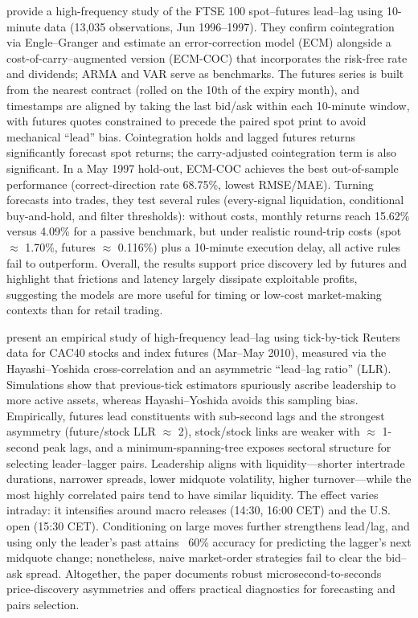\cite{BROOKS200131} provide a high-frequency study of the FTSE 100 spot--futures lead--lag using 10-minute data (13{,}035 observations, Jun 1996--1997). They confirm cointegration via Engle--Granger and estimate an error-correction model (ECM) alongside a cost-of-carry–augmented version (ECM-COC) that incorporates the risk-free rate and dividends; ARMA and VAR serve as benchmarks. The futures series is built from the nearest contract (rolled on the 10th of the expiry month), and timestamps are aligned by taking the last bid/ask within each 10-minute window, with futures quotes constrained to precede the paired spot print to avoid mechanical “lead” bias. Cointegration holds and lagged futures returns significantly forecast spot returns; the carry-adjusted cointegration term is also significant. In a May 1997 hold-out, ECM-COC achieves the best out-of-sample performance (correct-direction rate 68.75\%, lowest RMSE/MAE). Turning forecasts into trades, they test several rules (every-signal liquidation, conditional buy-and-hold, and filter thresholds): without costs, monthly returns reach 15.62\% versus 4.09\% for a passive benchmark, but under realistic round-trip costs (spot $\approx$ 1.70\%, futures $\approx$ 0.116\%) plus a 10-minute execution delay, all active rules fail to outperform. Overall, the results support price discovery led by futures and highlight that frictions and latency largely dissipate exploitable profits, suggesting the models are more useful for timing or low-cost market-making contexts than for retail trading.

\cite{huth2012leadlag} present an empirical study of high-frequency lead–lag using tick-by-tick Reuters data for CAC40 stocks and index futures (Mar–May 2010), measured via the Hayashi–Yoshida cross-correlation and an asymmetric “lead–lag ratio” (LLR). Simulations show that previous-tick estimators spuriously ascribe leadership to more active assets, whereas Hayashi–Yoshida avoids this sampling bias. Empirically, futures lead constituents with sub-second lags and the strongest asymmetry (future/stock LLR $\approx$ 2), stock/stock links are weaker with $\approx$ 1-second peak lags, and a minimum-spanning-tree exposes sectoral structure for selecting leader–lagger pairs. Leadership aligns with liquidity—shorter intertrade durations, narrower spreads, lower midquote volatility, higher turnover—while the most highly correlated pairs tend to have similar liquidity. The effect varies intraday: it intensifies around macro releases (14:30, 16:00 CET) and the U.S. open (15:30 CET). Conditioning on large moves further strengthens lead/lag, and using only the leader’s past attains ~60\% accuracy for predicting the lagger’s next midquote change; nonetheless, naive market-order strategies fail to clear the bid–ask spread. Altogether, the paper documents robust microsecond-to-seconds price-discovery asymmetries and offers practical diagnostics for forecasting and pairs selection. 

